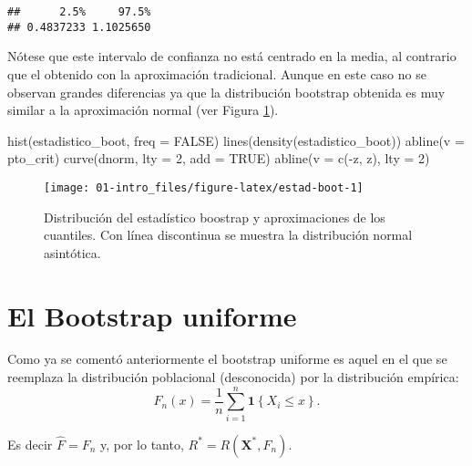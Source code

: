 \documentclass[
]{book}
\newenvironment{Shaded}{\begin{snugshade}}{\end{snugshade}}
\newcommand{\AttributeTok}[1]{\textcolor[rgb]{0.77,0.63,0.00}{#1}}
\newcommand{\ConstantTok}[1]{\textcolor[rgb]{0.00,0.00,0.00}{#1}}
\newcommand{\DecValTok}[1]{\textcolor[rgb]{0.00,0.00,0.81}{#1}}
\newcommand{\FunctionTok}[1]{\textcolor[rgb]{0.00,0.00,0.00}{#1}}
\newcommand{\NormalTok}[1]{#1}
\newcommand{\SpecialCharTok}[1]{\textcolor[rgb]{0.00,0.00,0.00}{#1}}
\theoremstyle{break}
\theoremstyle{definition}
\theoremstyle{definition}
\theoremstyle{definition}
\theoremstyle{definition}
\theoremstyle{remark}
\begin{document}
\begin{verbatim}
##      2.5%     97.5% 
## 0.4837233 1.1025650
\end{verbatim}

Nótese que este intervalo de confianza no está centrado en la media,
al contrario que el obtenido con la aproximación tradicional.
Aunque en este caso no se observan grandes diferencias ya que
la distribución bootstrap obtenida es muy similar a la aproximación normal
(ver Figura \ref{fig:estad-boot}).

\begin{Shaded}
\begin{Highlighting}[]
\FunctionTok{hist}\NormalTok{(estadistico\_boot, }\AttributeTok{freq =} \ConstantTok{FALSE}\NormalTok{)}
\FunctionTok{lines}\NormalTok{(}\FunctionTok{density}\NormalTok{(estadistico\_boot))}
\FunctionTok{abline}\NormalTok{(}\AttributeTok{v =}\NormalTok{ pto\_crit)}
\FunctionTok{curve}\NormalTok{(dnorm, }\AttributeTok{lty =} \DecValTok{2}\NormalTok{, }\AttributeTok{add =} \ConstantTok{TRUE}\NormalTok{)}
\FunctionTok{abline}\NormalTok{(}\AttributeTok{v =} \FunctionTok{c}\NormalTok{(}\SpecialCharTok{{-}}\NormalTok{z, z), }\AttributeTok{lty =} \DecValTok{2}\NormalTok{)}
\end{Highlighting}
\end{Shaded}

\begin{figure}[!htb]

{\centering \texttt{[image: 01-intro\_files/figure-latex/estad-boot-1]} 

}

\caption{Distribución del estadístico boostrap y aproximaciones de los cuantiles. Con línea discontinua se muestra la distribución normal asintótica.}\label{fig:estad-boot}
\end{figure}

\hypertarget{intro-unif}{%
\section{El Bootstrap uniforme}\label{intro-unif}}

Como ya se comentó anteriormente el bootstrap uniforme es aquel en el que
se reemplaza la distribución poblacional (desconocida) por la distribución
empírica:
\[F_n\left( x \right) =\frac{1}{n}\sum_{i=1}^{n}\mathbf{1}\left\{ X_i\leq x\right\}.\]

Es decir \(\hat{F}=F_n\) y, por lo tanto,
\(R^{\ast}=R\left( \mathbf{X}^{\ast},F_n \right)\).
\end{document}
